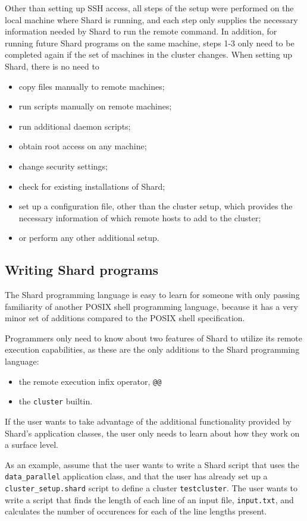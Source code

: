 \documentclass[twoside]{report}
\begin{document}
Other than setting up SSH access, all steps of the setup were performed on the local machine where Shard is running, and each step only supplies the necessary information needed by Shard to run the remote command.
In addition, for running future Shard programs on the same machine, steps 1-3 only need to be completed again if the set of machines in the cluster changes.
When setting up Shard, there is no need to
\begin{itemize}
  \item copy files manually to remote machines;
  \item run scripts manually on remote machines;
  \item run additional daemon scripts;
  \item obtain root access on any machine;
  \item change security settings;
  \item check for existing installations of Shard;
  \item set up a configuration file, other than the cluster setup, which provides the necessary information of which remote hosts to add to the cluster;
  \item or perform any other additional setup.
\end{itemize}

\subsection{Writing Shard programs}

The Shard programming language is easy to learn for someone with only passing familiarity of another POSIX shell programming language, because it has a very minor set of additions compared to the POSIX shell specification.

Programmers only need to know about two features of Shard to utilize its remote execution capabilities, as these are the only additions to the Shard programming language:
\begin{itemize}
  \item the remote execution infix operator, \texttt{@@}
  \item the \texttt{cluster} builtin.
\end{itemize}
If the user wants to take advantage of the additional functionality provided by Shard's application classes, the user only needs to learn about how they work on a surface level.

As an example, assume that the user wants to write a Shard script that uses the \texttt{data\_parallel} application class, and that the user has already set up a \texttt{cluster\_setup.shard} script to define a cluster \texttt{testcluster}.
The user wants to write a script that finds the length of each line of an input file, \texttt{input.txt}, and calculates the number of occurences for each of the line lengths present.
\end{document}
